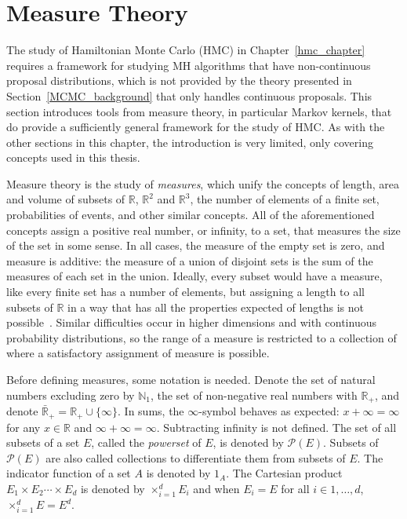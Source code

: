 \documentclass[english,twoside,openright]{HYgraduMLDS}
\newcommand{\R}{\mathbb{R}}
\newcommand{\N}{\mathbb{N}}
\DeclareMathOperator*{\bigtimes}{\times}
\begin{document}
\section{Measure Theory}

The study of Hamiltonian Monte Carlo (HMC) in Chapter~\ref{hmc_chapter}
requires a framework for studying MH algorithms
that have non-continuous proposal distributions, which is not provided
by the theory presented in Section~\ref{MCMC_background} that only handles
continuous proposals.
This section introduces tools from measure theory, in particular
Markov kernels, that do provide a sufficiently general
framework for the study of HMC. As with the other sections in this chapter,
the introduction is very limited, only covering concepts used in this thesis.

Measure theory is the study of \emph{measures}, which unify the concepts
of length, area and volume of subsets of \(\R\), \(\R^{2}\) and
\(\R^{3}\), the number of elements of a finite set, probabilities of events,
and other similar
concepts. All of the aforementioned concepts assign a positive real number,
or infinity, to a set, that measures the size of the set in some sense.
In all cases, the measure of the empty set is zero, and measure is
additive: the measure of a union of disjoint sets is the sum of the measures
of each set in the union. Ideally, every subset would have a measure, like
every finite set has a number of elements, but assigning a
length to all subsets of \(\R\) in a way that has all the properties expected
of lengths
is not possible~\cite{Cin11}. Similar difficulties occur in higher dimensions and with
continuous probability distributions, so the range of a measure is
restricted to a collection of where a satisfactory assignment of measure is
possible.

Before defining measures, some notation is needed. Denote the set of
natural numbers excluding zero by \(\N_{1}\), the set of
non-negative real numbers with \(\R_{+}\), and denote
\(\bar{\R}_{+} = \R_{+}\cup \{\infty\}\). In sums, the \(\infty\)-symbol
behaves as expected: \(x + \infty = \infty\) for any \(x\in \R\) and
\(\infty + \infty = \infty\). Subtracting infinity is not defined.
The set of all subsets of a set \(E\), called
the \emph{powerset} of \(E\), is denoted by \(\mathcal{P}(E)\).
Subsets of \(\mathcal{P}(E)\) are also called collections to
differentiate them from subsets of \(E\).
The indicator function of a set \(A\) is denoted by \(1_{A}\).
The Cartesian product \(E_{1}\times E_{2}\dotsb \times E_{d}\)
is denoted by \(\bigtimes_{i=1}^{d}E_{i}\) and when \(E_{i} = E\) for
all \(i\in 1,\dotsc,d\), \(\bigtimes_{i=1}^{d}E = E^{d}\).
\end{document}
